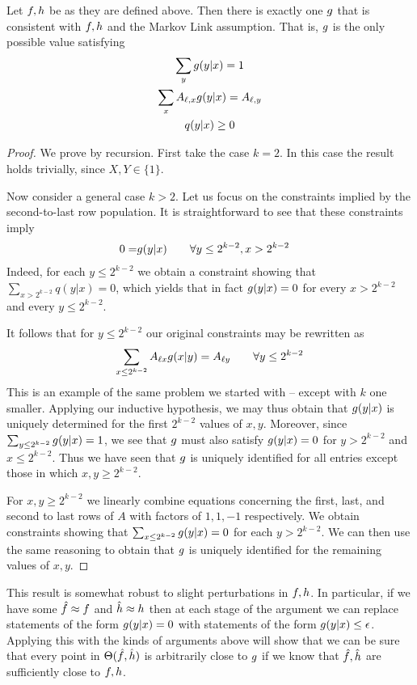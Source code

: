 \begin{thm}\label{thm:miracle}
Let $f,h$ be as they are defined above.  Then there is exactly one $g$ that is consistent with $f,h$ and the Markov Link assumption.  That is, $g$ is the only possible value satisfying
\begin{gather*}
\sum_y g(y|x)=1 \\
\sum_x A_{\ell,x}g(y|x)=A_{\ell,y}\\
q(y|x)\geq 0
\end{gather*}
\end{thm} 
\begin{proof}
We prove by recursion.  First take the case $k=2$.  In this case the result holds trivially, since $X,Y\in\{1\}$.

Now consider a general case $k>2$.  Let us focus on the constraints implied by the second-to-last row population.  It is straightforward to see that these constraints imply
\begin{align*}
0=&g(y|x) \qquad \forall y\leq 2^{k-2},x>2^{k-2}
\end{align*}
Indeed, for each $y\leq 2^{k-2}$ we obtain a constraint showing that $\sum_{x>2^{k-2}}q(y|x)=0$, which yields that in fact $g(y|x)=0$ for every $x>2^{k-2}$ and every $y\leq 2^{k-2}$.

It follows that for $y\leq 2^{k-2}$ our original constraints may be rewritten as
\[
\sum_{x\leq2^{k-2}} A_{\ell x} g(x|y) = A_{\ell y} \qquad \forall y\leq 2^{k-2}
\]
This is an example of the same problem we started with -- except with $k$ one smaller.  Applying our inductive hypothesis, we may thus obtain that $g(y|x)$ is uniquely determined for the first $2^{k-2}$ values of $x,y$.  Moreover, since $\sum_{y\leq 2^{k-2}} g(y|x)=1$, we see that $g$ must also satisfy $g(y|x)=0$ for $y>2^{k-2}$ and $x\leq 2^{k-2}$.  Thus we have seen that $g$ is uniquely identified for all entries except those in which $x,y\geq 2^{k-2}$.

For $x,y \geq2^{k-2}$ we linearly combine equations concerning the first, last, and second to last rows of $A$ with factors of $1,1,-1$ respectively.  We obtain constraints showing that $\sum_{x\leq2^{k-2}}g(y|x)=0$ for each $y>2^{k-2}$.  We can then use the same reasoning to obtain that $g$ is uniquely identified for the remaining values of $x,y$.
\end{proof}

This result is somewhat robust to slight perturbations in $f,h$.  In particular, if we have some $\hat {f}\approx f$ and $\hat {h}\approx h$ then at each stage of the argument we can replace statements of the form $g(y|x)=0$ with statements of the form $g(y|x)\leq \epsilon$.  Applying this with the kinds of arguments above will show that we can be sure that every point in $\Theta(\hat {f},\hat {h})$ is arbitrarily close to $g$ if we know that $\hat {f},\hat {h}$ are sufficiently close to $f,h$.  

